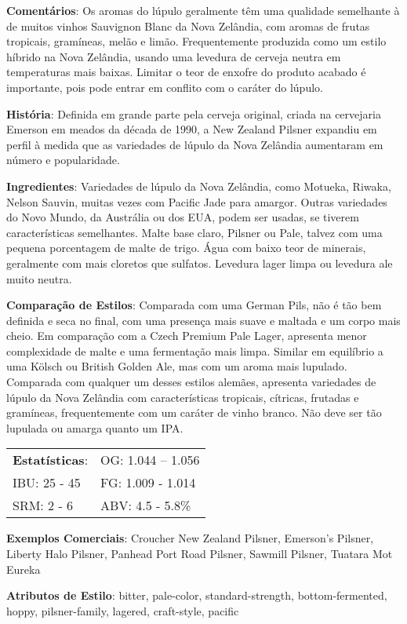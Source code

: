 \textbf{Comentários}: Os aromas do lúpulo geralmente têm uma qualidade semelhante à de muitos vinhos Sauvignon Blanc da Nova Zelândia, com aromas de frutas tropicais, gramíneas, melão e limão. Frequentemente produzida como um estilo híbrido na Nova Zelândia, usando uma levedura de cerveja neutra em temperaturas mais baixas. Limitar o teor de enxofre do produto acabado é importante, pois pode entrar em conflito com o caráter do lúpulo.

\textbf{História}: Definida em grande parte pela cerveja original, criada na cervejaria Emerson em meados da década de 1990, a New Zealand Pilsner expandiu em perfil à medida que as variedades de lúpulo da Nova Zelândia aumentaram em número e popularidade.

\textbf{Ingredientes}: Variedades de lúpulo da Nova Zelândia, como Motueka, Riwaka, Nelson Sauvin, muitas vezes com Pacific Jade para amargor. Outras variedades do Novo Mundo, da Austrália ou dos EUA, podem ser usadas, se tiverem características semelhantes. Malte base claro, Pilsner ou Pale, talvez com uma pequena porcentagem de malte de trigo. Água com baixo teor de minerais, geralmente com mais cloretos que sulfatos. Levedura lager limpa ou levedura ale muito neutra.

\textbf{Comparação de Estilos}: Comparada com uma German Pils, não é tão bem definida e seca no final, com uma presença mais suave e maltada e um corpo mais cheio. Em comparação com a Czech Premium Pale Lager, apresenta menor complexidade de malte e uma fermentação mais limpa. Similar em equilíbrio a uma Kölsch ou British Golden Ale, mas com um aroma mais lupulado. Comparada com qualquer um desses estilos alemães, apresenta variedades de lúpulo da Nova Zelândia com características tropicais, cítricas, frutadas e gramíneas, frequentemente com um caráter de vinho branco. Não deve ser tão lupulada ou amarga quanto um IPA.

\begin{tabular}{@{}p{35mm}p{35mm}@{}}
  \textbf{Estatísticas}: & OG: 1.044 – 1.056\\
  IBU: 25 - 45 & FG: 1.009 - 1.014 \\
  SRM: 2 - 6  & ABV: 4.5 - 5.8\%
\end{tabular}

\textbf{Exemplos Comerciais}: Croucher New Zealand Pilsner, Emerson’s Pilsner, Liberty Halo Pilsner, Panhead Port Road Pilsner, Sawmill Pilsner, Tuatara Mot Eureka

\textbf{Atributos de Estilo}: bitter, pale-color, standard-strength, bottom-fermented, hoppy, pilsner-family, lagered, craft-style, pacific